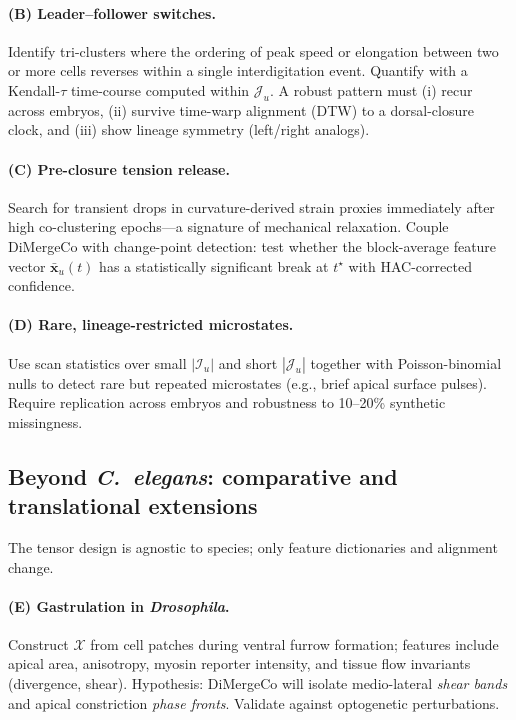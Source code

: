 \documentclass[unnumsec,webpdf,modern,large,namedate]{oup-authoring-template}%
\theoremstyle{thmstyleone}\newtheorem{theorem}{Theorem}
\theoremstyle{thmstyletwo}\newtheorem{example}{Example}
\theoremstyle{thmstylethree}\newtheorem{definition}{Definition}
\begin{document}
\paragraph{(B) Leader–follower switches.}
Identify tri-clusters where the ordering of peak speed or elongation between two or more
cells reverses within a single interdigitation event.  Quantify with a Kendall-$\tau$
 time-course computed within $\mathcal{J}_u$.  A robust pattern must (i) recur across
embryos, (ii) survive time-warp alignment (DTW) to a dorsal-closure clock, and
(iii) show lineage symmetry (left/right analogs).

\paragraph{(C) Pre-closure tension release.}
Search for transient drops in curvature-derived strain proxies immediately after high
co-clustering epochs---a signature of mechanical relaxation.  Couple DiMergeCo with
change-point detection: test whether the block-average feature vector
$\bar{\mathbf{x}}_u(t)$ has a statistically significant break at $t^\star$ with
HAC-corrected confidence.

\paragraph{(D) Rare, lineage-restricted microstates.}
Use scan statistics over small $|\mathcal{I}_u|$ and short $|\mathcal{J}_u|$ together
with Poisson-binomial nulls to detect rare but repeated microstates (e.g., brief apical
surface pulses).  Require replication across embryos and robustness to 10--20\% synthetic
missingness.

\subsection{Beyond \textit{C.~elegans}: comparative and translational extensions}
The tensor design is agnostic to species; only feature dictionaries and alignment change.

\paragraph{(E) Gastrulation in \textit{Drosophila}.}
Construct $\mathcal{X}$ from cell patches during ventral furrow formation; features include
apical area, anisotropy, myosin reporter intensity, and tissue flow invariants
(divergence, shear).  Hypothesis: DiMergeCo will isolate medio-lateral \emph{shear bands}
 and apical constriction \emph{phase fronts}.  Validate against optogenetic perturbations.
\end{document}
